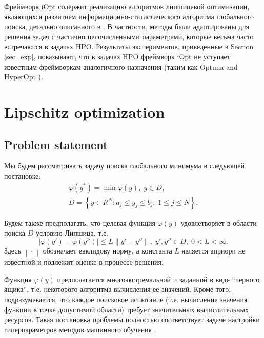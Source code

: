 \documentclass[preprint,12pt]{elsarticle}
\begin{document}
Фреймворк iOpt содержит реализацию алгоритмов липшицевой оптимизации, являющихся развитием информационно-статистического алгоритма глобального поиска, детально описанного в \cite{Strongin2000,Sergeyev2013}. 
В частности, методы были адаптированы для решения задач с частично целочисленными параметрами, которые весьма часто встречаются в задачах HPO.
Результаты экспериментов, приведенные в Section \ref{sec_exp}, показывают, что в задачах HPO фреймворк iOpt не уступает известным фреймворкам аналогичного назначения (таким как Optuna \cite{optuna} and HyperOpt \cite{hyperopt}).

\section{Lipschitz optimization} 
\label{sec_lip}

\subsection{Problem statement} 

Мы будем рассматривать задачу поиска глобального минимума в следующей постановке:
\begin{gather}
	\varphi(y^*) = \min \varphi(y), \; y \in D, \label{f_func} \\
	D = \left\{y \in R^N : a_j \leq y_j \leq b_j , \; 1 \leq j \leq N \right\}. \label{f_D}
\end{gather}

Будем также предполагать, что целевая функция $\varphi(y)$ удовлетворяет в области поиска $D$ условию Липшица, т.е.
\begin{equation} \label{f_lip}
	\left| \varphi(y')-\varphi(y'') \right| \leq L\left\| y' - y''  \right\| , \; y',y'' \in D, \; 0<L<\infty.
\end{equation}
Здесь $ \left\| \cdot \right\|$ обозначает евклидову норму, а константа $L$ является априори не известной и подлежит оценке в процессе решения. 

Функция $\varphi(y)$ предполагается многоэкстремальной и заданной в виде ``черного ящика'', т.е. некоторого алгоритма вычисления ее значений. Кроме того, подразумевается, что каждое поисковое испытание (т.е. вычисление значения функции в точке допустимой области) требует значительных вычислительных ресурсов. Такая постановка проблемы полностью соответствует задаче настройки гиперпараметров методов машинного обучения \cite{Joy2020,Wang2021}.
\end{document}

